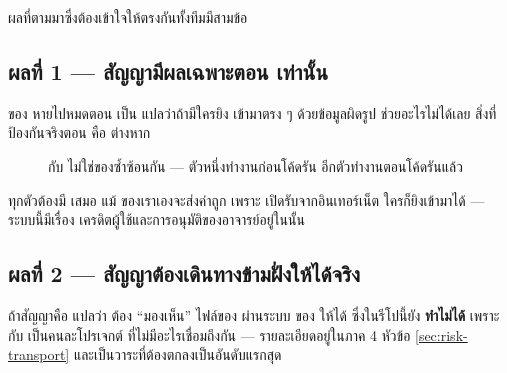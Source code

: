 ผลที่ตามมาซึ่งต้องเข้าใจให้ตรงกันทั้งทีมมีสามข้อ

\subsection{ผลที่ 1 --- สัญญามีผลเฉพาะตอน  เท่านั้น}

 ของ  หายไปหมดตอน  เป็น 
แปลว่าถ้ามีใครยิง  เข้ามาตรง ๆ ด้วยข้อมูลผิดรูป  ช่วยอะไรไม่ได้เลย
สิ่งที่ป้องกันจริงตอน  คือ \textbf{} ต่างหาก

\begin{figure}[H]
\centering
{}
\caption{ กับ  ไม่ใช่ของซ้ำซ้อนกัน --- ตัวหนึ่งทำงานก่อนโค้ดรัน อีกตัวทำงานตอนโค้ดรันแล้ว}
\end{figure}

\begin{warnbox}[title={อย่าคิดว่า ``มี \en{type} แล้วไม่ต้อง \en{validate}''}]
 ทุกตัวต้องมี  เสมอ แม้  ของเราเองจะส่งค่าถูก
เพราะ  เปิดรับจากอินเทอร์เน็ต ใครก็ยิงเข้ามาได้ --- ระบบนี้มีเรื่อง
เครดิตผู้ใช้และการอนุมัติของอาจารย์อยู่ในนั้น
\end{warnbox}

\subsection{ผลที่ 2 --- สัญญาต้องเดินทางข้ามฝั่งให้ได้จริง}

ถ้าสัญญาคือ  แปลว่า  ต้อง ``มองเห็น'' ไฟล์ของ 
ผ่านระบบ  ของ  ให้ได้ ซึ่งในรีโปนี้ยัง \textbf{ทำไม่ได้}
เพราะ  กับ  เป็นคนละโปรเจกต์
 ที่ไม่มีอะไรเชื่อมถึงกัน --- รายละเอียดอยู่ในภาค 4 หัวข้อ
\ref{sec:risk-transport} และเป็นวาระที่ต้องตกลงเป็นอันดับแรกสุด

